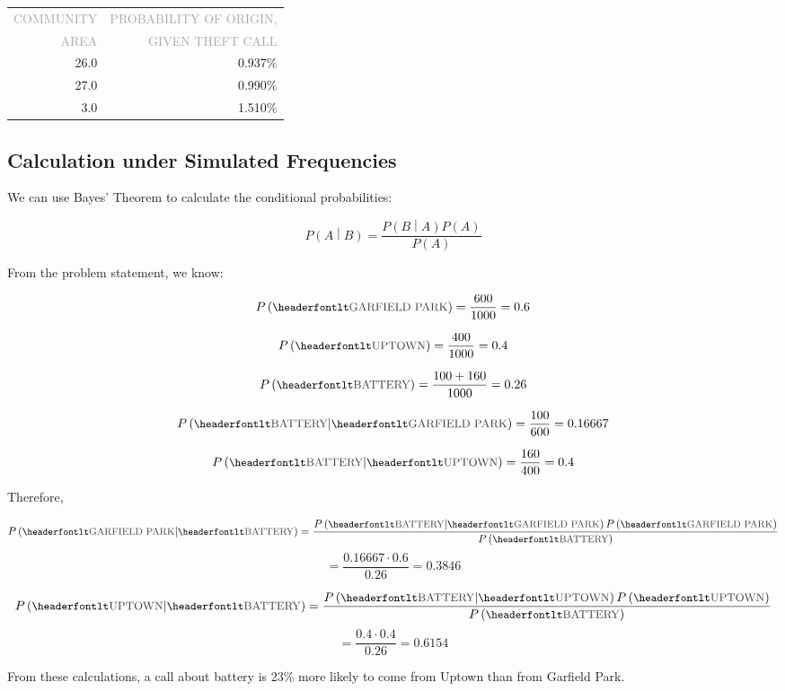 \documentclass[11pt]{article}
\newcommand{\printsubsection}[1]{\normalfont\headerfontlt\textcolor{darkgray}{{#1}}}
\newcommand{\opns}[1]{\textrm{\small\printsubsection{\MakeUppercase{#1}}}}
\begin{document}
\begin{table}[H]
\centering \renewcommand{\arraystretch}{1.2}
\begin{tabular}{r|r}
\opns{Community}      & \opns{Probability of Origin,} \\
\opns{Area} &  \opns{given theft call} \\\hline
26.0 &        0.937\% \\
27.0 &        0.990\% \\
3.0  &        1.510\% \\
\end{tabular}
\end{table}

\subsection{Calculation under Simulated Frequencies}
We can use Bayes' Theorem to calculate the conditional probabilities:

$$ P\left( A\middle\vert B\right) = \frac{P\left( B\middle\vert A\right) P\left( A\right) }{P\left( A\right)} $$

From the problem statement, we know: 
\begin{multicols}{2}
$$ P\left(\opns{GARFIELD PARK}\right) = \frac{600}{1000}  = 0.6 $$

$$ P\left(\opns{UPTOWN}\right) = \frac{400}{1000}  = 0.4 $$

$$ P\left(\opns{BATTERY}\right) = \frac{100 + 160}{1000}  = 0.26 $$

$$ P\left(\opns{BATTERY} \middle\vert \opns{GARFIELD PARK} \right) = \frac{100}{600}  = 0.16667 $$

$$ P\left(\opns{BATTERY} \middle\vert \opns{UPTOWN} \right) = \frac{160}{400}  = 0.4 $$
\end{multicols}

Therefore, 

$$ P\left(\opns{GARFIELD PARK} \middle\vert \opns{BATTERY} \right) = \frac{P\left( \opns{BATTERY} \middle\vert \opns{GARFIELD PARK}\right) P\left( \opns{GARFIELD PARK}\right) }{P\left(\opns{BATTERY}\right)}$$
$$ = \frac{0.16667\cdot 0.6}{0.26} = 0.3846 $$

$$ P\left(\opns{UPTOWN} \middle\vert \opns{BATTERY} \right) = \frac{P\left( \opns{BATTERY} \middle\vert \opns{UPTOWN}\right) P\left( \opns{UPTOWN}\right) }{P\left(\opns{BATTERY}\right)}$$
$$ = \frac{0.4\cdot 0.4}{0.26} = 0.6154 $$

From these calculations, a call about battery is 23\% more likely to come from Uptown than from Garfield Park.
\end{document}
